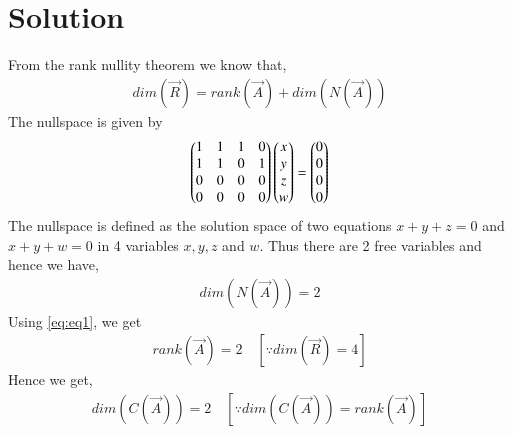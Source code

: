 \documentclass[journal,12pt,twocolumn]{IEEEtran}
\begin{document}
\section{Solution}
From the rank nullity theorem we know that,
\begin{align}
	dim(\vec{R}) = rank(\vec{A}) + dim(N(\vec{A})) \label{eq:eq1}
\end{align}
The nullspace is given by 
\begin{align}
	\begin{pmatrix}1 & 1 & 1 & 0 \\ 1 & 1 & 0 & 1\\ 0 & 0 & 0 & 0\\0 & 0 & 0 & 0\end{pmatrix}\begin{pmatrix}x\\y\\z\\w\end{pmatrix} = \begin{pmatrix}0 \\ 0 \\ 0 \\ 0\end{pmatrix}
\end{align}	
The nullspace is defined as the solution space of two equations $x + y + z = 0$ and $x + y + w = 0$ in 4 variables $x, y, z$ and $w$. Thus there are 2 free variables and hence we have,
\begin{align}
	dim(N(\vec{A})) = 2
\end{align}
Using \eqref{eq:eq1}, we get
\begin{align}
	rank(\vec{A}) = 2 \quad [\because dim(\vec{R}) = 4]
\end{align}
Hence we get,
\begin{align}
	dim(C(\vec{A})) = 2 \quad [\because dim(C(\vec{A})) = rank(\vec{A})]
\end{align}
\end{document}
